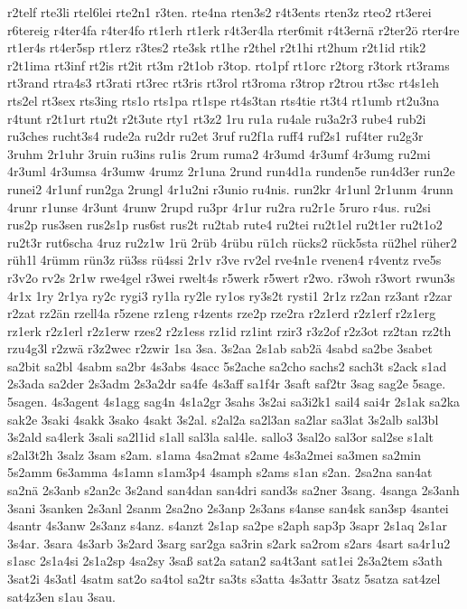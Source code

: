 {r2telf
rte3li
rtel6lei
rte2n1
r3ten.
rte4na
rten3s2
r4t3ents
rten3z
rteo2
rt3erei
r6tereig
r4ter4fa
r4ter4fo
rt1erh
rt1erk
r4t3er4la
rter6mit
r4t3ernä
r2ter2ö
rter4re
rt1er4s
rt4er5sp
rt1erz
r3tes2
rte3sk
rt1he
r2thel
r2t1hi
rt2hum
r2t1id
rtik2
r2t1ima
rt3inf
rt2is
rt2it
rt3m
r2t1ob
r3top.
rto1pf
rt1orc
r2torg
r3tork
rt3rams
rt3rand
rtra4s3
rt3rati
rt3rec
rt3ris
rt3rol
rt3roma
r3trop
r2trou
rt3sc
rt4s1eh
rts2el
rt3sex
rts3ing
rts1o
rts1pa
rt1spe
rt4s3tan
rts4tie
rt3t4
rt1umb
rt2u3na
r4tunt
r2t1urt
rtu2t
r2t3ute
rty1
rt3z2
1ru
ru1a
ru4ale
ru3a2r3
rube4
rub2i
ru3ches
rucht3s4
rude2a
ru2dr
ru2et
3ruf
ru2f1a
ruff4
ruf2s1
ruf4ter
ru2g3r
3ruhm
2r1uhr
3ruin
ru3ins
ru1is
2rum
ruma2
4r3umd
4r3umf
4r3umg
ru2mi
4r3uml
4r3umsa
4r3umw
4rumz
2r1una
2rund
run4d1a
runden5e
run4d3er
run2e
runei2
4r1unf
run2ga
2rungl
4r1u2ni
r3unio
ru4nis.
run2kr
4r1unl
2r1unm
4runn
4runr
r1unse
4r3unt
4runw
2rupd
ru3pr
4r1ur
ru2ra
ru2r1e
5ruro
r4us.
ru2si
rus2p
rus3sen
rus2s1p
rus6st
rus2t
ru2tab
rute4
ru2tei
ru2t1el
ru2t1er
ru2t1o2
ru2t3r
rut6scha
4ruz
ru2z1w
1rü
2rüb
4rübu
rü1ch
rücks2
rück5sta
rü2hel
rüher2
rüh1l
4rümm
rün3z
rü3ss
rü4ssi
2r1v
r3ve
rv2el
rve4n1e
rvenen4
r4ventz
rve5s
r3v2o
rv2s
2r1w
rwe4gel
r3wei
rwelt4s
r5werk
r5wert
r2wo.
r3woh
r3wort
rwun3s
4r1x
1ry
2r1ya
ry2c
rygi3
ry1la
ry2le
ry1os
ry3s2t
rysti1
2r1z
rz2an
rz3ant
r2zar
r2zat
rz2än
rzell4a
r5zene
rz1eng
r4zents
rze2p
rze2ra
r2z1erd
r2z1erf
r2z1erg
rz1erk
r2z1erl
r2z1erw
rzes2
r2z1ess
rz1id
rz1int
rzir3
r3z2of
r2z3ot
rz2tan
rz2th
rzu4g3l
r2zwä
r3z2wec
r2zwir
1sa
3sa.
3s2aa
2s1ab
sab2ä
4sabd
sa2be
3sabet
sa2bit
sa2bl
4sabm
sa2br
4s3abs
4sacc
5s2ache
sa2cho
sachs2
sach3t
s2ack
s1ad
2s3ada
sa2der
2s3adm
2s3a2dr
sa4fe
4s3aff
sa1f4r
3saft
saf2tr
3sag
sag2e
5sage.
5sagen.
4s3agent
4s1agg
sag4n
4s1a2gr
3sahs
3s2ai
sa3i2k1
sail4
sai4r
2s1ak
sa2ka
sak2e
3saki
4sakk
3sako
4sakt
3s2al.
s2al2a
sa2l3an
sa2lar
sa3lat
3s2alb
sal3bl
3s2ald
sa4lerk
3sali
sa2l1id
s1all
sal3la
sal4le.
sallo3
3sal2o
sal3or
sal2se
s1alt
s2al3t2h
3salz
3sam
s2am.
s1ama
4sa2mat
s2ame
4s3a2mei
sa3men
sa2min
5s2amm
6s3amma
4s1amn
s1am3p4
4samph
s2ams
s1an
s2an.
2sa2na
san4at
sa2nä
2s3anb
s2an2c
3s2and
san4dan
san4dri
sand3s
sa2ner
3sang.
4sanga
2s3anh
3sani
3sanken
2s3anl
2sanm
2sa2no
2s3anp
2s3ans
s4anse
san4sk
san3sp
4santei
4santr
4s3anw
2s3anz
s4anz.
s4anzt
2s1ap
sa2pe
s2aph
sap3p
3sapr
2s1aq
2s1ar
3s4ar.
3sara
4s3arb
3s2ard
3sarg
sar2ga
sa3rin
s2ark
sa2rom
s2ars
4sart
sa4r1u2
s1asc
2s1a4si
2s1a2sp
4sa2sy
3saß
sat2a
satan2
sa4t3ant
sat1ei
2s3a2tem
s3ath
3sat2i
4s3atl
4satm
sat2o
sa4tol
sa2tr
sa3ts
s3atta
4s3attr
3satz
5satza
sat4zel
sat4z3en
s1au
3sau.
}
